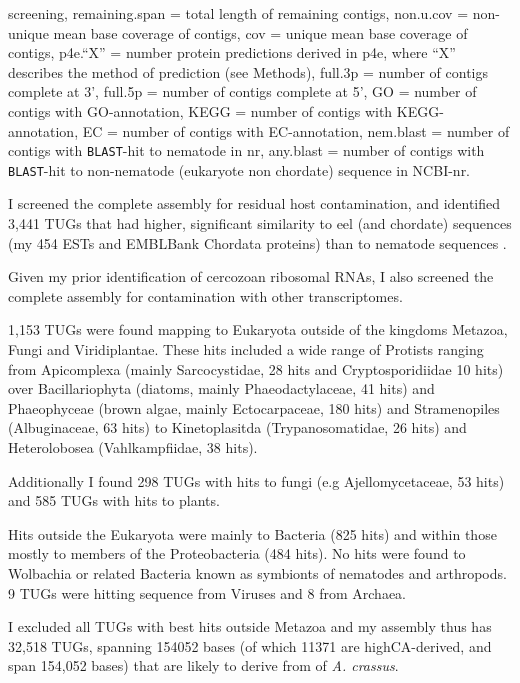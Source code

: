 \begin{table}[!h]
\begin{center}
{  screening, remaining.span = total length of remaining contigs,
  non.u.cov = non-unique mean base coverage of contigs, cov = unique
  mean base coverage of contigs, p4e.``X'' = number protein
  predictions derived in p4e, where ``X'' describes the method of
  prediction (see Methods), full.3p = number of contigs complete at
  3', full.5p = number of contigs complete at 5', GO = number of
  contigs with GO-annotation, KEGG = number of contigs with
  KEGG-annotation, EC = number of contigs with EC-annotation,
  nem.blast = number of contigs with \texttt{BLAST}-hit to nematode in
  nr, any.blast = number of contigs with \texttt{BLAST}-hit to
  non-nematode (eukaryote non chordate) sequence in NCBI-nr.}
\label{ass-stat}
  \end{center}
\end{table}

\afterpage{\clearpage}

I screened the complete assembly for residual host contamination, and
identified 3,441 TUGs that had higher, significant similarity to eel
(and chordate) sequences (my 454 ESTs and EMBLBank Chordata proteins)
than to nematode sequences \cite{pmid21550347}.

Given my prior identification of cercozoan ribosomal RNAs, I also
screened the complete assembly for contamination with other
transcriptomes.

1,153 TUGs were found mapping to Eukaryota outside of the kingdoms
Metazoa, Fungi and Viridiplantae. These hits included a wide range of
Protists ranging from Apicomplexa (mainly Sarcocystidae, 28 hits and
Cryptosporidiidae 10 hits) over Bacillariophyta (diatoms, mainly
Phaeodactylaceae, 41 hits) and Phaeophyceae (brown algae, mainly
Ectocarpaceae, 180 hits) and Stramenopiles (Albuginaceae, 63 hits) to
Kinetoplasitda (Trypanosomatidae, 26 hits) and Heterolobosea
(Vahlkampfiidae, 38 hits).

Additionally I found 298 TUGs with hits to fungi (e.g
Ajellomycetaceae, 53 hits) and 585 TUGs with hits to plants.

Hits outside the Eukaryota were mainly to Bacteria (825 hits) and
within those mostly to members of the Proteobacteria (484 hits). No
hits were found to Wolbachia or related Bacteria known as symbionts of
nematodes and arthropods. 9 TUGs were hitting sequence from Viruses
and 8 from Archaea.

I excluded all TUGs with best hits outside Metazoa and my assembly
thus has 32,518 TUGs, spanning 154052 bases (of which 11371 are
highCA-derived, and span 154,052 bases) that are likely to derive from
of \textit{A. crassus}.


